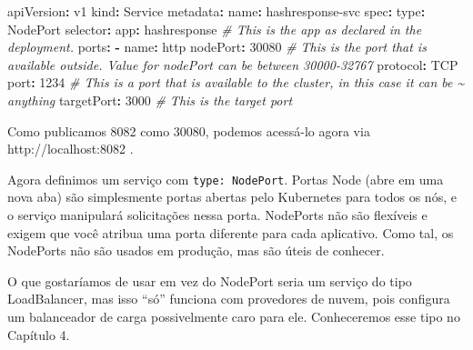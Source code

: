 \documentclass[
]{article}
\newenvironment{Shaded}{}{}
\newcommand{\AttributeTok}[1]{\textcolor[rgb]{0.49,0.56,0.16}{#1}}
\newcommand{\CommentTok}[1]{\textcolor[rgb]{0.38,0.63,0.69}{\textit{#1}}}
\newcommand{\DecValTok}[1]{\textcolor[rgb]{0.25,0.63,0.44}{#1}}
\newcommand{\ExtensionTok}[1]{#1}
\newcommand{\FunctionTok}[1]{\textcolor[rgb]{0.02,0.16,0.49}{#1}}
\newcommand{\KeywordTok}[1]{\textcolor[rgb]{0.00,0.44,0.13}{\textbf{#1}}}
\newcommand{\NormalTok}[1]{#1}
\begin{document}
\begin{Shaded}
\begin{Highlighting}[]
\FunctionTok{apiVersion}\KeywordTok{:}\AttributeTok{ v1}
\FunctionTok{kind}\KeywordTok{:}\AttributeTok{ Service}
\FunctionTok{metadata}\KeywordTok{:}
\AttributeTok{  }\FunctionTok{name}\KeywordTok{:}\AttributeTok{ hashresponse{-}svc}
\FunctionTok{spec}\KeywordTok{:}
\AttributeTok{  }\FunctionTok{type}\KeywordTok{:}\AttributeTok{ NodePort}
\AttributeTok{  }\FunctionTok{selector}\KeywordTok{:}
\AttributeTok{    }\FunctionTok{app}\KeywordTok{:}\AttributeTok{ hashresponse}\CommentTok{ \# This is the app as declared in the deployment.}
\AttributeTok{  }\FunctionTok{ports}\KeywordTok{:}
\AttributeTok{    }\KeywordTok{{-}}\AttributeTok{ }\FunctionTok{name}\KeywordTok{:}\AttributeTok{ http}
\AttributeTok{      }\FunctionTok{nodePort}\KeywordTok{:}\AttributeTok{ }\DecValTok{30080}\CommentTok{ \# This is the port that is available outside. Value for nodePort can be between 30000{-}32767}
\AttributeTok{      }\FunctionTok{protocol}\KeywordTok{:}\AttributeTok{ TCP}
\AttributeTok{      }\FunctionTok{port}\KeywordTok{:}\AttributeTok{ }\DecValTok{1234}\CommentTok{ \# This is a port that is available to the cluster, in this case it can be \textasciitilde{} anything}
\AttributeTok{      }\FunctionTok{targetPort}\KeywordTok{:}\AttributeTok{ }\DecValTok{3000}\CommentTok{ \# This is the target port}
\end{Highlighting}
\end{Shaded}

\begin{Shaded}
\end{Shaded}

Como publicamos 8082 como 30080, podemos acessá-lo agora via
http://localhost:8082 .

Agora definimos um serviço com \texttt{type:\ NodePort}. Portas Node
(abre em uma nova aba) são simplesmente portas abertas pelo Kubernetes
para todos os nós, e o serviço manipulará solicitações nessa porta.
NodePorts não são flexíveis e exigem que você atribua uma porta
diferente para cada aplicativo. Como tal, os NodePorts não são usados em
produção, mas são úteis de conhecer.

O que gostaríamos de usar em vez do NodePort seria um serviço do tipo
LoadBalancer, mas isso ``só'' funciona com provedores de nuvem, pois
configura um balanceador de carga possivelmente caro para ele.
Conheceremos esse tipo no Capítulo 4.
\end{document}
